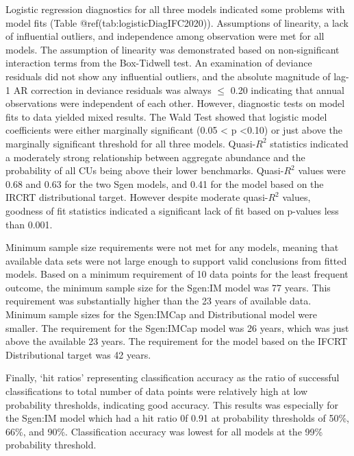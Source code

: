 \documentclass[
]{article}
\begin{document}
Logistic regression diagnostics for all three models indicated some
problems with model fits (Table @ref(tab:logisticDiagIFC2020)).
Assumptions of linearity, a lack of influential outliers, and
independence among observation were met for all models. The assumption
of linearity was demonstrated based on non-significant interaction terms
from the Box-Tidwell test. An examination of deviance residuals did not
show any influential outliers, and the absolute magnitude of lag-1 AR
correction in deviance residuals was always \(\leq\) 0.20 indicating
that annual observations were independent of each other. However,
diagnostic tests on model fits to data yielded mixed results. The Wald
Test showed that logistic model coefficients were either marginally
significant (0.05 \textless{} p \textless0.10) or just above the
marginally significant threshold for all three models. Quasi-\(R^2\)
statistics indicated a moderately strong relationship between aggregate
abundance and the probability of all CUs being above their lower
benchmarks. Quasi-\(R^2\) values were 0.68 and 0.63 for the two Sgen
models, and 0.41 for the model based on the IRCRT distributional target.
However despite moderate quasi-\(R^2\) values, goodness of fit
statistics indicated a significant lack of fit based on p-values less
than 0.001.

Minimum sample size requirements were not met for any models, meaning
that available data sets were not large enough to support valid
conclusions from fitted models. Based on a minimum requirement of 10
data points for the least frequent outcome, the minimum sample size for
the Sgen:IM model was 77 years. This requirement was substantially
higher than the 23 years of available data. Minimum sample sizes for the
Sgen:IMCap and Distributional model were smaller. The requirement for
the Sgen:IMCap model was 26 years, which was just above the available 23
years. The requirement for the model based on the IFCRT Distributional
target was 42 years.

Finally, `hit ratios' representing classification accuracy as the ratio
of successful classifications to total number of data points were
relatively high at low probability thresholds, indicating good accuracy.
This results was especially for the Sgen:IM model which had a hit ratio
0f 0.91 at probability thresholds of 50\%, 66\%, and 90\%.
Classification accuracy was lowest for all models at the 99\%
probability threshold.
\end{document}
